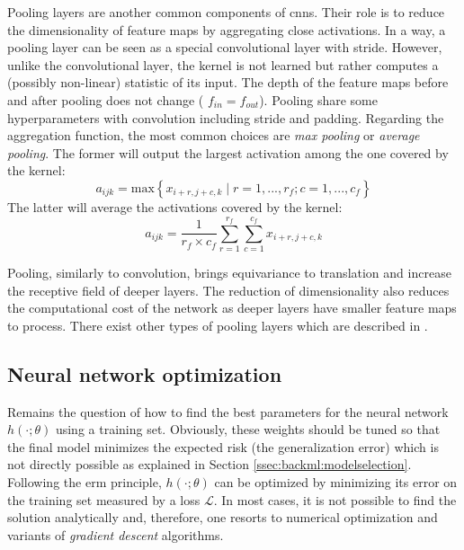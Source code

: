 Pooling layers are another common components of \acrshort{cnn}s. Their role is to
reduce the dimensionality of feature maps by aggregating close activations. In a
way, a pooling layer can be seen as a special convolutional layer with stride. However, 
unlike the convolutional layer, the kernel is not learned but rather computes a (possibly 
non-linear) statistic of its input.
The depth of the feature maps before and after pooling does not change (\ie
$f_{in} = f_{out}$). Pooling share some hyperparameters with convolution including
stride and padding. Regarding the aggregation function, the most common choices
are \textit{max pooling} or \textit{average pooling}. The former will output the
largest activation among the one covered by the kernel:
\begin{equation}
\label{eqn:backml:maxpooling}
a_{ijk} = \text{max} \left\{ x_{i+r,j+c,k} \mid r = 1, ..., r_f; c = 1, ..., c_f \right\}
\end{equation}
The latter will average the activations covered by the kernel:
\begin{equation}
\label{eqn:backml:avgpooling}
a_{ijk} = \frac{1}{r_f \times c_f} \sum_{r=1}^{r_f} \sum_{c=1}^{c_f}  x_{i+r,j+c,k}
\end{equation}

Pooling, similarly to convolution, brings equivariance to translation and increase
the receptive field of deeper layers. The reduction of dimensionality also reduces
the computational cost of the network as deeper layers have smaller feature maps
to process. There exist other types of pooling layers which are described in
\cite{gholamalinezhad2020pooling}.

\subsection{Neural network optimization}
\label{ssec:backml:dl:opti}
Remains the question of how to find the best parameters for the neural network
$h(\cdot; \theta)$ using a training set. Obviously, these weights should be tuned
so that the final model minimizes the expected risk (\ie the generalization error)
which is not directly possible as explained in Section \ref{ssec:backml:modelselection}.
Following the \acrshort{erm} principle, $h(\cdot; \theta)$ can be optimized by
minimizing its error on the training set measured by a loss $\mathcal{L}$. In most
cases, it is not possible to find the solution analytically and, therefore, one
resorts to numerical optimization and variants of \textit{gradient descent}
algorithms.

